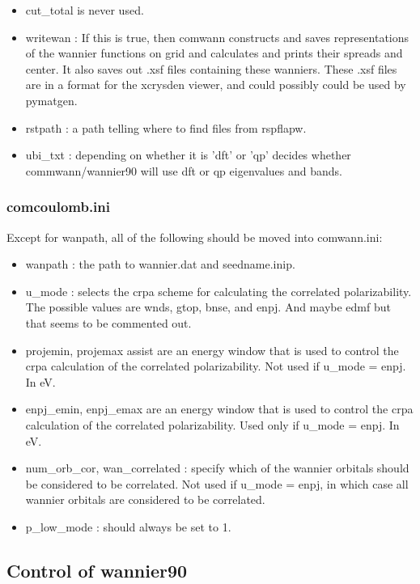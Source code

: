 \documentclass[aps,prb,singlecolumn,preprintnumbers,amsmath,amssymb]{revtex4}
\begin{document}
\begin{itemize}
  \item cut\_total is never used.
  \item writewan : If this is true, then comwann constructs and saves representations of the wannier functions on grid and calculates and prints their spreads and center.  It also  saves out .xsf files containing these wanniers.  These .xsf files are in a format for the xcrysden viewer, and could possibly could be used by pymatgen.
  \item rstpath : a path telling where to find files from rspflapw.
\item ubi\_txt  : depending on whether it is 'dft' or 'qp' decides whether commwann/wannier90 will use dft or qp eigenvalues and bands.    
\end{itemize}

\subsubsection{comcoulomb.ini}

Except for wanpath, all of the following should be moved into comwann.ini:
\begin{itemize}
\item wanpath : the path to wannier.dat and seedname.inip.
\item u\_mode  : selects the crpa scheme for calculating the correlated polarizability.  The possible values are wnds, gtop,  bnse, and enpj. And maybe edmf but that seems to be commented out.
\item projemin, projemax assist are an energy window that is used to control the crpa calculation of the correlated polarizability.  Not used if u\_mode = enpj.  In eV.
\item enpj\_emin, enpj\_emax are an energy window that is used to control the crpa calculation of the correlated polarizability.  Used only if u\_mode = enpj.  In eV.
\item num\_orb\_cor, wan\_correlated : specify which of the wannier orbitals should be considered to be correlated.  Not used if u\_mode = enpj, in which case all wannier orbitals are considered to be correlated.
\item p\_low\_mode : should always be set to 1.
\end{itemize}


 


\subsection{Control of wannier90}
\end{document}
